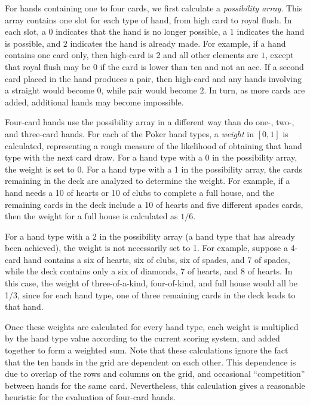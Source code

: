 \documentclass[letterpaper]{article}
\begin{document}
For hands containing one to four cards, we first calculate a {\it possibility array}. This array contains one slot for each type of hand, from high card to royal flush. In each slot, a $0$ indicates that the hand is no longer possible, a $1$ indicates the hand is possible, and $2$ indicates the hand is already made. For example, if a hand contains one card only, then high-card is $2$ and all other elements are $1$, except that royal flush may be $0$ if the card is lower than ten and not an ace. If a second card placed in the hand produces a pair, then high-card and any hands involving a straight would become $0$, while pair would become $2$. In turn, as more cards are added, additional hands may become impossible.

Four-card hands use the possibility array in a different way than do one-, two-, and three-card hands. For each of the Poker hand types, a {\it weight} in $[0,1]$ is calculated, representing a rough measure of the likelihood of obtaining that hand type with the next card draw. For a hand type with a 0 in the possibility array, the weight is set to 0. For a hand type with a 1 in the possibility array, the cards remaining in the deck are analyzed to determine the weight. For example, if a hand needs a 10 of hearts or 10 of clubs to complete a full house, and the remaining cards in the deck include a 10 of hearts and five different spades cards, then the weight for a full house is calculated as $1 / 6$. 

For a hand type with a 2 in the possibility array (a hand type that has already been achieved), the weight is not necessarily set to 1. For example, suppose a 4-card hand contains a six of hearts, six of clubs, six of spades, and 7 of spades, while the deck contains only a six of diamonds, 7 of hearts, and 8 of hearts. In this case, the weight of three-of-a-kind, four-of-kind, and full house would all be 1/3, since for each hand type, one of three remaining cards in the deck leads to that hand.

Once these weights are calculated for every hand type, each weight is multiplied by the hand type value according to the current scoring system, and added together to form a weighted sum. Note that these calculations ignore the fact that the ten hands in the grid are dependent on each other. This dependence is due to overlap of the rows and columns on the grid, and occasional ``competition'' between hands for the same card. Nevertheless, this calculation gives a reasonable heuristic for the evaluation of four-card hands.
\end{document}
